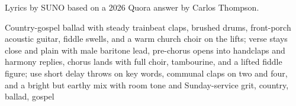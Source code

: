 
\begin{notes}
Lyrics by SUNO based on a 2026 Quora answer by Carlos Thompson.
\end{notes}
\begin{style}
Country-gospel ballad with steady trainbeat claps, brushed drums, front-porch acoustic guitar, fiddle swells, and a warm church choir on the lifts; verse stays close and plain with male baritone lead, pre-chorus opens into handclaps and harmony replies, chorus lands with full choir, tambourine, and a lifted fiddle figure; use short delay throws on key words, communal claps on two and four, and a bright but earthy mix with room tone and Sunday-service grit, country, ballad, gospel
\end{style}
